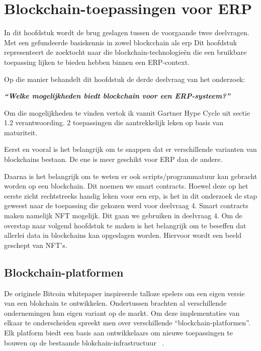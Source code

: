 \chapter{Blockchain-toepassingen voor ERP}
\label{ch:blockchain-toepassingen-voor-erp}

In dit hoofdstuk wordt de brug geslagen tussen de voorgaande twee deelvragen. 
Met een gefundeerde basiskennis in zowel blockcchain als erp 
Dit hoofdstuk representeert de zoektocht naar die blockchain-technologieën die een bruikbare toepassing lijken te bieden hebben binnen een ERP-context.


Op die manier behandelt dit hoofdstuk de derde deelvraag van het onderzoek:
\begin{center}
	\textit{\textbf{``Welke mogelijkheden biedt blockchain voor een ERP-systeem?''}}
\end{center}

Om die mogelijkheden te vinden vertok ik vanuit Gartner Hype Cycle uit sectie 1.2 verantwoording. 2 toepassingen die aantrekkelijk leken op basis van maturiteit.

Eerst en vooral is het belangrijk om te snappen dat er verschillende varianten van blockchains bestaan. De ene is meer geschikt voor ERP dan de andere.

Daarna is het belangrijk om te weten er ook scripts/programmatuur kan gebracht worden op een blockchain. Dit noemen we smart contracts. Hoewel deze op het eerste zicht rechtstreeks handig leken voor een erp, is het in dit onderzoek de stap geweest naar de toepassing die gekozen werd voor deelvraag 4.
Smart contracts maken namelijk NFT mogelijk. Dit gaan we gebruiken in deelvraag 4.
Om de overstap naar volgend hoofdstuk te maken is het belangrijk om te beseffen dat allerlei data in blockchains kan opgeslagen worden. Hiervoor wordt een beeld geschept van NFT's.

\section{Blockchain-platformen}

De originele Bitcoin whitepaper inspireerde talloze spelers om een eigen versie van een blokchain te ontwikkelen. Ondertussen brachten al verschillende ondernemingen hun eigen variant op de markt. Om deze implementaties van elkaar te onderscheiden spreekt men over verschillende ``blockchain-platformen''. Elk platform biedt een basis aan ontwikkelaars om nieuwe toepassingen te bouwen op de bestaande blokchain-infrastructuur
~\autocite{Saraf2018}.

